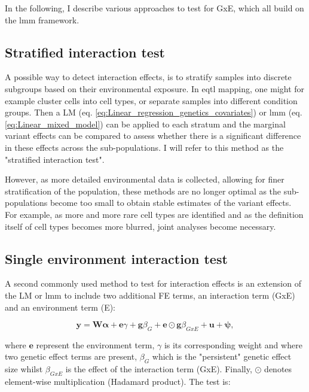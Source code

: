 In the following, I describe various approaches to test for GxE, which all build on the \gls{lmm} framework. 

\subsection{Stratified interaction test}

A possible way to detect interaction effects, is to stratify samples into discrete subgroups based on their environmental exposure.
In \gls{eqtl} mapping, one might for example cluster cells into cell types, or separate samples into different condition groups.
Then a LM (eq. \eqref{eq:Linear_regression_genetics_covariates}) or \gls{lmm} (eq. \eqref{eq:Linear_mixed_model}) can be applied to each stratum and the marginal variant effects can be compared to assess whether there is a significant difference in these effects across the sub-populations.
I will refer to this method as the "stratified interaction test".

However, as more detailed environmental data is collected, allowing for finer stratification of the population, these methods are no longer optimal as the sub-populations become too small to obtain stable estimates of the variant effects.
For example, as more and more rare cell types are identified and as the definition itself of cell types becomes more blurred, joint analyses become necessary.


\subsection{Single environment interaction test}

A second commonly used method to test for interaction effects is an extension of the LM or \gls{lmm} to include two additional FE terms, an interaction term (GxE) and an environment term (E):

\begin{equation}\label{eq:Interaction_test_FE_LMM}
 \mathbf{y} =  \mathbf{W}\boldsymbol{\alpha} + \mathbf{e}\gamma  + \mathbf{g}\beta_G + \mathbf{e}\odot\mathbf{g}\beta_{GxE} + \mathbf{u} + \boldsymbol{\psi}, 
\end{equation}

where $\mathbf{e}$ represent the environment term, $\gamma$ is its corresponding weight and where two genetic effect terms are present, $\beta_G$ which is the "persistent" genetic effect size whilst $\beta_{GxE}$ is the effect of the interaction term (GxE).
Finally, $\odot$ denotes element-wise multiplication (Hadamard product).
The test is:

